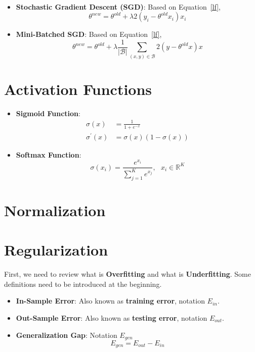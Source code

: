 \documentclass[a4paper]{article}
\begin{document}
\begin{itemize}
\begin{align}
	\end{align}
	\item \textbf{Stochastic Gradient Descent (SGD)}: Based on Equation~\ref{lf},
	\begin{equation}
		{\theta}^{new} = {\theta}^{old} + \lambda 2 (y_i - {\theta}^{old} x_i) x_i
	\end{equation}
	\item \textbf{Mini-Batched SGD}: Based on Equation~\ref{lf},
	\begin{equation}
		{\theta}^{new} = {\theta}^{old} + \lambda \frac{1}{|\mathcal{B}|} \sum_{(x, y) \in \mathcal{B}} 2 (y - {\theta}^{old} x) x
	\end{equation}
\end{itemize}

\section{Activation Functions}

\begin{itemize}
	\item \textbf{Sigmoid Function}:
	\begin{align}
		\sigma (x) &= \frac{1}{1 + e^{-x}} \\
		\sigma^{\prime} (x) &= \sigma (x) (1 - \sigma(x))
	\end{align}
	\item \textbf{Softmax Function}: 
	\begin{equation}
		\sigma (x_i) = \frac{e^{x_i}}{\sum_{j=1}^{K} e^{x_j}},\,\,\,\, x_i \in \mathbb{R}^K
	\end{equation}
\end{itemize}

\section{Normalization}

\section{Regularization}

First, we need to review what is \textbf{Overfitting} and what is \textbf{Underfitting}. Some definitions need to be introduced at the beginning.
\begin{itemize}
	\item \textbf{In-Sample Error}: Also known as \textbf{training error}, notation $E_{in}$.
	\item \textbf{Out-Sample Error}: Also known as \textbf{testing error}, notation $E_{out}$.
	\item \textbf{Generalization Gap}: Notation $E_{gen}$
	\begin{equation}
		E_{gen} = E_{out} - E_{in}
	\end{equation}
\end{itemize}
\end{document}
